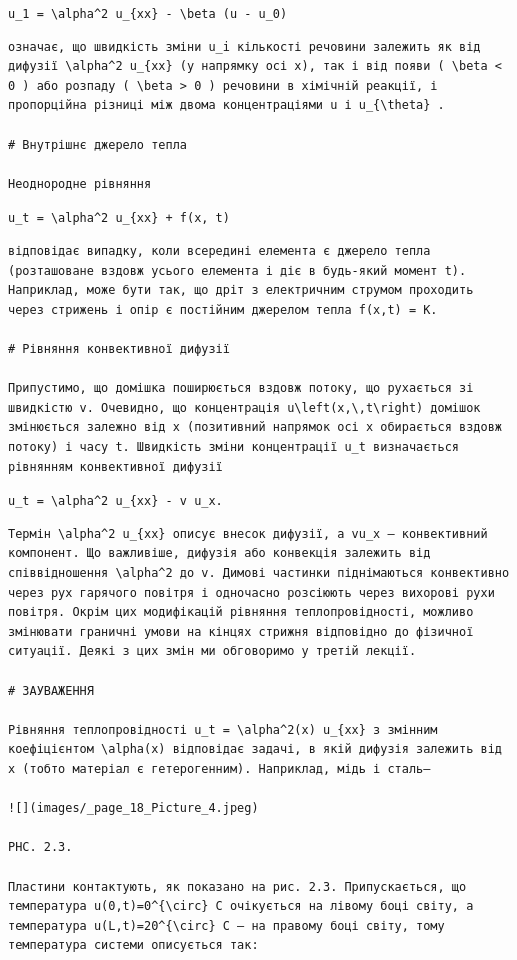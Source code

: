 \documentclass[
  ukrainian,
]{article}
\begin{document}
\texttt{u\_1\ =\ \textbackslash{}alpha\^{}2\ u\_\{xx\}\ -\ \textbackslash{}beta\ (u\ -\ u\_0)}

\begin{verbatim}
означає, що швидкість зміни u_i кількості речовини залежить як від дифузії \alpha^2 u_{xx} (у напрямку осі x), так і від появи ( \beta < 0 ) або розпаду ( \beta > 0 ) речовини в хімічній реакції, і пропорційна різниці між двома концентраціями u і u_{\theta} .

# Внутрішнє джерело тепла

Неоднородне рівняння
\end{verbatim}

\texttt{u\_t\ =\ \textbackslash{}alpha\^{}2\ u\_\{xx\}\ +\ f(x,\ t)}

\begin{verbatim}
відповідає випадку, коли всередині елемента є джерело тепла (розташоване вздовж усього елемента і діє в будь-який момент t). Наприклад, може бути так, що дріт з електричним струмом проходить через стрижень і опір є постійним джерелом тепла f(x,t) = K.

# Рівняння конвективної дифузії

Припустимо, що домішка поширюється вздовж потоку, що рухається зі швидкістю v. Очевидно, що концентрація u\left(x,\,t\right) домішок змінюється залежно від x (позитивний напрямок осі x обирається вздовж потоку) і часу t. Швидкість зміни концентрації u_t визначається рівнянням конвективної дифузії
\end{verbatim}

\texttt{u\_t\ =\ \textbackslash{}alpha\^{}2\ u\_\{xx\}\ -\ v\ u\_x.}

\begin{verbatim}
Термін \alpha^2 u_{xx} описує внесок дифузії, а vu_x — конвективний компонент. Що важливіше, дифузія або конвекція залежить від співвідношення \alpha^2 до v. Димові частинки піднімаються конвективно через рух гарячого повітря і одночасно розсіюють через вихорові рухи повітря. Окрім цих модифікацій рівняння теплопровідності, можливо змінювати граничні умови на кінцях стрижня відповідно до фізичної ситуації. Деякі з цих змін ми обговоримо у третій лекції.

# ЗАУВАЖЕННЯ

Рівняння теплопровідності u_t = \alpha^2(x) u_{xx} з змінним коефіцієнтом \alpha(x) відповідає задачі, в якій дифузія залежить від x (тобто матеріал є гетерогенним). Наприклад, мідь і сталь—

![](images/_page_18_Picture_4.jpeg)

PHC. 2.3.

Пластини контактують, як показано на рис. 2.3. Припускається, що температура u(0,t)=0^{\circ} C очікується на лівому боці світу, а температура u(L,t)=20^{\circ} C — на правому боці світу, тому температура системи описується так:
\end{verbatim}
\end{document}
